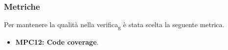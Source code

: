 \subsubsection{Metriche}
Per mantenere la qualità nella verifica\textsubscript{g} è stata scelta la seguente metrica.
\begin{itemize}
    \item \textbf{MPC12: Code coverage}.
\end{itemize}